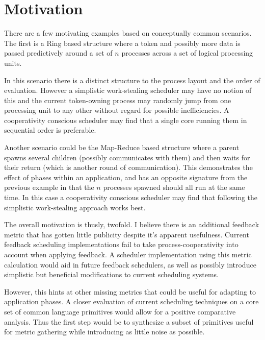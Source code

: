 \section{Motivation}
There are a few motivating examples based on conceptually common scenarios. The first is a Ring based structure 
where a token and possibly more data is passed predictively around a set of $n$ processes across a set of logical
processing units.

In this scenario there is a distinct structure to the process layout and the order of evaluation. However a 
simplistic work-stealing scheduler may have no notion of this and the current token-owning process may randomly
jump from one processing unit to any other without regard for possible inefficiencies. A cooperativity conscious
scheduler may find that a single core running them in sequential order is preferable.

Another scenario could be the Map-Reduce based structure where a parent spawns several children (possibly 
communicates with them) and then waits for their return (which is another round of communication). This 
demonstrates the effect of phases within an application, and has an opposite signature from the previous example
in that the $n$ processes spawned should all run at the same time. In this case a cooperativity conscious scheduler
may find that following the simplistic work-stealing approach works best.

The overall motivation is thusly, twofold. I believe there is an additional feedback metric that has gotten little
publicity despite it's apparent usefulness. Current feedback scheduling implementations fail to take 
process-cooperativity into account when applying feedback. A scheduler implementation using this metric calculation 
would aid in future feedback schedulers, as well as possibly introduce simplistic but beneficial modifications to 
current scheduling systems.

However, this hints at other missing metrics that could be useful for adapting to application phases. A closer 
evaluation of current scheduling techniques on a core set of common language primitives would allow for a positive
comparative analysis. Thus the first step would be to synthesize a subset of primitives useful for metric gathering 
while introducing as little noise as possible. 

